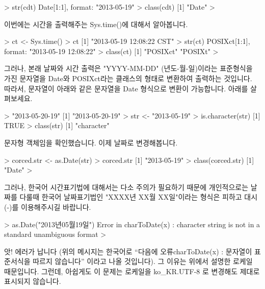 \begin{Schunk}
\begin{Soutput} 
> str(cdt)
 Date[1:1], format: "2013-05-19"
> class(cdt)
[1] "Date"
> 
\end{Soutput}
\end{Schunk}

이번에는 시간을 출력해주는 Sys.time()에 대해서 알아봅니다.

\begin{Schunk}
\begin{Soutput} 
> ct <- Sys.time()
> ct
[1] "2013-05-19 12:08:22 CST"
> str(ct)
 POSIXct[1:1], format: "2013-05-19 12:08:22"
> class(ct)
[1] "POSIXct" "POSIXt" 
>
\end{Soutput}
\end{Schunk}

그러나, 본래 날짜와 시간 출력은 "YYYY-MM-DD" (년도-월-일)이라는 표준형식을 가진 문자열을 Date와 POSIXct라는 클래스의 형태로 변환하여 출력하는 것입니다. 
따라서, 문자열이 아래와 같은 문자열을 Date 형식으로 변환이 가능합니다. 
아래를 살펴보세요. 

\begin{Schunk}
\begin{Soutput} 
> "2013-05-20-19"
[1] "2013-05-20-19"
> str <- "2013-05-19"
> is.character(str)
[1] TRUE
> class(str)
[1] "character"
\end{Soutput}
\end{Schunk}

문자형 객체임을 확인했습니다.
이제 날짜로 변경해봅니다.

\begin{Schunk}
\begin{Soutput} 
> corced.str <- as.Date(str)
> corced.str 
[1] "2013-05-19"
> class(corced.str)
[1] "Date"
> 
\end{Soutput}
\end{Schunk}

그러나, 한국어 시간표기법에 대해서는 다소 주의가 필요하기 때문에 개인적으로는 날짜를 다룰때 한국어 날짜표기법인 "XXXX년 XX월 XX일"이라는 형식은 피하고 대시 (-)를 이용해주시길 바랍니다. 

\begin{Schunk}
\begin{Soutput} 
> as.Date("2013년05월19일")
Error in charToDate(x) : 
  character string is not in a standard unambiguous format
> 
\end{Soutput}
\end{Schunk}

앗! 에러가 납니다 (위의 메시지는 한국어로 ``다음에 오류charToDate(x) : 문자열이 표준서식을 따르지 않습니다'' 이라고 나올 것입니다).  
그 이유는 위에서 설명한 로케일 때문입니다.
그런데, 아쉽게도 이 문제는 로케일을 ko\_KR.UTF-8 로 변경해도 제대로 표시되지 않습니다. 

